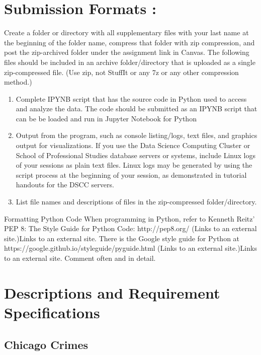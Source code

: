 \documentclass[11pt]{article}
\providecommand{\tightlist}{%
      \setlength{\itemsep}{0pt}\setlength{\parskip}{0pt}}
\begin{document}
\hypertarget{submission-formats}{%
\section{Submission Formats :}\label{submission-formats}}

Create a folder or directory with all supplementary files with your last
name at the beginning of the folder name, compress that folder with zip
compression, and post the zip-archived folder under the assignment link
in Canvas. The following files should be included in an archive
folder/directory that is uploaded as a single zip-compressed file. (Use
zip, not StuffIt or any 7z or any other compression method.)

\begin{enumerate}
\def\labelenumi{\arabic{enumi}.}
\tightlist
\item
  Complete IPYNB script that has the source code in Python used to
  access and analyze the data. The code should be submitted as an IPYNB
  script that can be be loaded and run in Jupyter Notebook for Python
\item
  Output from the program, such as console listing/logs, text files, and
  graphics output for visualizations. If you use the Data Science
  Computing Cluster or School of Professional Studies database servers
  or systems, include Linux logs of your sessions as plain text files.
  Linux logs may be generated by using the script process at the
  beginning of your session, as demonstrated in tutorial handouts for
  the DSCC servers.
\item
  List file names and descriptions of files in the zip-compressed
  folder/directory.
\end{enumerate}

Formatting Python Code When programming in Python, refer to Kenneth
Reitz' PEP 8: The Style Guide for Python Code: http://pep8.org/ (Links
to an external site.)Links to an external site. There is the Google
style guide for Python at
https://google.github.io/styleguide/pyguide.html (Links to an external
site.)Links to an external site. Comment often and in detail.

    \hypertarget{descriptions-and-requirement-specifications}{%
\section{Descriptions and Requirement
Specifications}\label{descriptions-and-requirement-specifications}}

    \hypertarget{chicago-crimes}{%
\subsection{Chicago Crimes}\label{chicago-crimes}}
\end{document}
